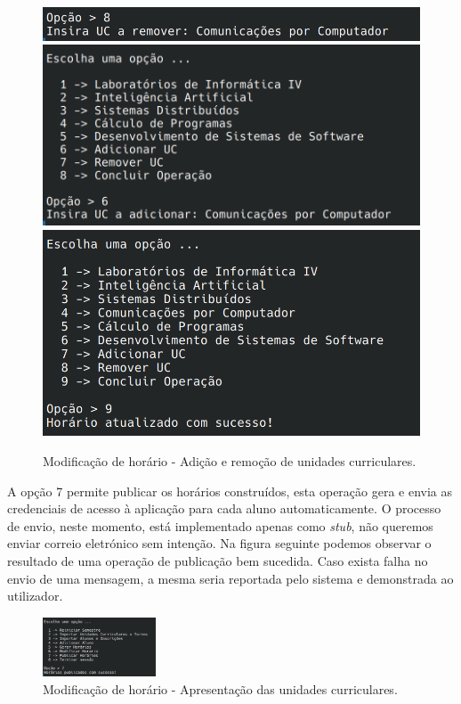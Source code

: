 \documentclass[12pt, a4paper]{article}
\begin{document}
\begin{figure}[H]
    \centering
    \includegraphics[width=\textwidth]{Imagens/Manual/DiretorCurso-6-2.png}
    \includegraphics[width=\textwidth]{Imagens/Manual/DiretorCurso-6-3.png}
    \includegraphics[width=\textwidth]{Imagens/Manual/DiretorCurso-6-4.png}
    \caption{Modificação de horário - Adição e remoção de unidades curriculares.}
\end{figure}

A opção 7 permite publicar os horários construídos, esta operação gera e envia as credenciais de
acesso à aplicação para cada aluno automaticamente. O processo de envio, neste momento, está
implementado apenas como \emph{stub}, não queremos enviar correio eletrónico sem intenção. Na figura
seguinte podemos observar o resultado de uma operação de publicação bem sucedida. Caso exista falha
no envio de uma mensagem, a mesma seria reportada pelo sistema e demonstrada ao utilizador. \\

\begin{figure}[H]
    \centering
    \includegraphics[width=0.3\textwidth]{Imagens/Manual/DiretorCurso-7.png}
    \caption{Modificação de horário - Apresentação das unidades curriculares.}
\end{figure}
\end{document}
